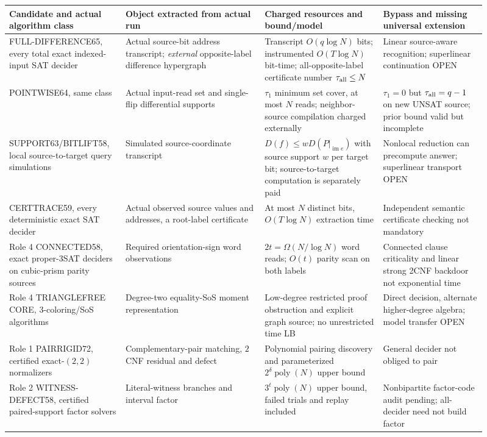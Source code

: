 \documentclass[10pt]{article}
\begin{document}
\begin{longtable}{p{0.205\linewidth}p{0.27\linewidth}p{0.235\linewidth}p{0.20\linewidth}}
\toprule
Candidate and actual algorithm class & Object extracted from actual run & Charged resources and bound/model & Bypass and missing universal extension\\\midrule
\endhead
FULL-DIFFERENCE65, every total exact indexed-input SAT decider & Actual source-bit address transcript; \emph{external} opposite-label difference hypergraph & Transcript $O(q\log N)$ bits; instrumented $O(T\log N)$ bit-time; all-opposite-label certificate number $\tau_{\rm all}\le N$ & Linear source-aware recognition; superlinear continuation OPEN\\
POINTWISE64, same class & Actual input-read set and single-flip differential supports & $\tau_1$ minimum set cover, at most $N$ reads; neighbor-source compilation charged externally & $\tau_1=0$ but $\tau_{\rm all}=q-1$ on new UNSAT source; prior bound valid but incomplete\\
SUPPORT63/BITLIFT58, local source-to-target query simulations & Simulated source-coordinate transcript & $D(f)\le w D(P|_{\operatorname{im}e})$ with source support $w$ per target bit; source-to-target computation is separately paid & Nonlocal reduction can precompute answer; superlinear transport OPEN\\
CERTTRACE59, every deterministic exact SAT decider & Actual observed source values and addresses, a root-label certificate & At most $N$ distinct bits, $O(T\log N)$ extraction time & Independent semantic certificate checking not mandatory\\
Role 4 CONNECTED58, exact proper-3SAT deciders on cubic-prism parity sources & Required orientation-sign word observations & $2t=\Omega(N/\log N)$ word reads; $O(t)$ parity scan on both labels & Connected clause criticality and linear strong 2CNF backdoor not exponential time\\
Role 4 TRIANGLEFREE CORE, 3-coloring/SoS algorithms & Degree-two equality-SoS moment representation & Low-degree restricted proof obstruction and explicit graph source; no unrestricted time LB & Direct decision, alternate higher-degree algebra; model transfer OPEN\\
Role 1 PAIRRIGID72, certified exact-$(2,2)$ normalizers & Complementary-pair matching, $2$CNF residual and defect & Polynomial pairing discovery and parameterized $2^\delta\operatorname{poly}(N)$ upper bound & General decider not obliged to pair\\
Role 2 WITNESS-DEFECT58, certified paired-support factor solvers & Literal-witness branches and interval factor & $3^t\operatorname{poly}(N)$ upper bound, failed trials and replay included & Nonbipartite factor-code audit pending; all-decider need not build factor\\

\end{longtable}
\end{document}
